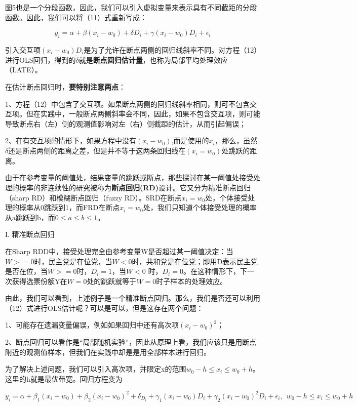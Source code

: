 \documentclass[cn,12pt,math=newtx,citestyle=gb7714-2015,bibstyle=gb7714-2015]{elegantbook}
\begin{document}
	图5也是一个分段函数，因此，我们可以引入虚拟变量来表示具有不同截距的分段函数。因此，我们可以将（11）式重新写成：
	
	\begin{equation}
		y_i=\alpha+\beta{(x_i-w_0)}+\delta{D_i}+\gamma{(x_i-w_0)D_i}+\epsilon_i
	\end{equation}
	
	引入交互项$(x_i-w_0)D_i$是为了允许在断点两侧的回归线斜率不同。对方程（12）进行OLS回归，得到的$\tilde{\delta}$就是\textbf{断点回归估计量}，也称为局部平均处理效应（LATE）。
	
	在估计断点回归时，\textbf{要特别注意两点}：
	
	1、方程（12）中包含了交互项。如果断点两侧的回归线斜率相同，则可不包含交互项。但在实践中，一般断点两侧斜率会不同，因此，如果不包含交互项，则可能导致断点右（左）侧的观测值影响对左（右）侧截距的估计，从而引起偏误；
	
	2、在有交互项的情形下，如果方程中没有$(x_i-w_0)$,而是使用的$x_i$，那么，虽然$\tilde{\delta}$还是断点两侧的距离之差，但是并不等于这两条回归线在$(x_i=w_0)$处跳跃的距离。
	
	由于在参考变量的阈值处，结果变量的跳跃或断点，那些探讨在某一阈值处接受处理的概率的非连续性的研究被称为\textbf{断点回归(RD)}设计。它又分为精准断点回归（sharp RD）和模糊断点回归（fuzzy RD）。SRD在断点$x_i=w_0$处，个体接受处理的概率从0跳跃到1，而FRD在断点$x_i=w_0$处，我们只知道个体接受处理的概率从a跳跃到b，而$0\le{a}\le{b}\le{1}$。
	
	I. 精准断点回归
	
	在Sharp RDD中，接受处理完全由参考变量W是否超过某一阈值决定：当$W>=0$时，民主党是在位党，当$W<0$时，共和党是在位党；即用D表示民主党是否在位，当$W>=0$时，$D_i=1$，当$W<0$ 时，$D_i=0$。在这种情形下，下一次获得选票份额Y在$W=0$处的跳跃就等于$W=0$时子样本的处理效应。
	
	由此，我们可以看到，上述例子是一个精准断点回归。那么，我们是否还可以利用（12）式进行OLS估计呢？可以是可以，但是这存在两个问题：
	
	1、可能存在遗漏变量偏误，例如如果回归中还有高次项$(x_i-w_0)^2$；
	
	2、断点回归可以看作是“局部随机实验”，因此从原理上看，我们应该只是用断点附近的观测值样本，但我们在实践中却是是用全部样本进行回归。
	
	为了解决上述问题，我们可以引入高次项，并限定x的范围$w_0-h\le{x_i}\le{w_0+h}$。这里的h就是最优带宽。回归方程变为
	
	\begin{equation}
		y_i=\alpha+\beta_1(x_i-w_0)+\beta_2(x_i-w_0)^2+\delta_{D_i}+\gamma_1(x_i-w_0)D_i+\gamma_2(x_i-w_0)^2D_i+\epsilon_i,~~w_0-h\le{x_i}\le{w_0+h}
	\end{equation}
	
\end{document}
